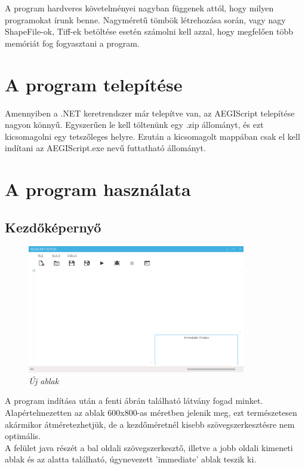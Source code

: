 \documentclass[a4paper,12pt]{report}
\begin{document}
A program hardveres követelményei nagyban függenek attól, hogy milyen programokat írunk benne. Nagyméretű tömbök létrehozása során, vagy nagy ShapeFile-ok, Tiff-ek betöltése esetén számolni kell azzal, hogy megfelően több memóriát fog fogyasztani a program. \\

\section{A program telepítése}

Amennyiben a .NET keretrendszer már telepítve van, az AEGIScript telepítése nagyon könnyű. Egyszerűen le kell töltenünk egy .zip állományt, és ezt kicsomagolni egy tetszőleges helyre. Ezután a kicsomagolt mappában csak el kell indítani az AEGIScript.exe nevű futtatható állományt.


\section{A program használata}
\subsection{Kezdőképernyő}
\begin{figure}[h]
  \caption{\textit{Új ablak}}
  \centering
    \includegraphics[width=0.85\textwidth]{images/newwindow.png}
\end{figure}
A program indítása után a fenti ábrán található látvány fogad minket. Alapértelmezetten az ablak 600x800-as méretben jelenik meg, ezt természetesen akármikor átméretezhetjük, de a kezdőméretnél kisebb szövegszerkesztésre nem optimális. \\
A felület java részét a bal oldali szövegszerkesztő, illetve a jobb oldali kimeneti ablak és az alatta található, úgynevezett 'immediate' ablak teszik ki. \\
\end{document}
